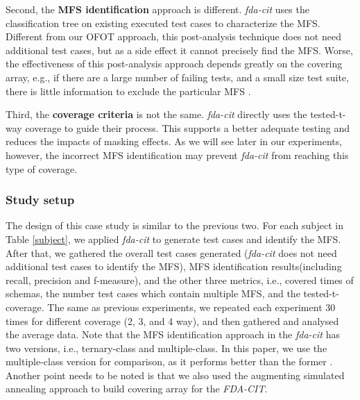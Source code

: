 \documentclass[10pt,journal,compsoc]{IEEEtran}
\begin{document}
Second, the \textbf{MFS identification} approach is different. \emph{fda-cit} uses the classification tree on existing executed test cases to characterize the MFS. Different from our OFOT approach, this post-analysis technique does not need additional test cases, but as a side effect it cannot precisely find the MFS. Worse, the effectiveness of this post-analysis approach depends greatly on the covering array, e.g., if there are a large number of failing tests, and a small size test suite, there is little information to exclude the particular MFS \cite{zhang2011characterizing}.

Third, the \textbf{coverage criteria} is not the same. \emph{fda-cit} directly uses the tested-t-way coverage to guide their process. This supports a better adequate testing and reduces the impacts of masking effects. As we will see later in our experiments, however, the incorrect MFS identification may prevent \emph{fda-cit} from reaching this type of coverage.


\subsubsection{Study setup}
The design of this case study is similar to the previous two. For each subject in Table \ref{subject}, we applied \emph{fda-cit} to generate test cases and identify the MFS. After that, we gathered the overall test cases generated (\emph{fda-cit} does not need additional test cases to identify the MFS), MFS identification results(including recall, precision and f-measure), and the other three metrics, i.e., covered times of schemas, the number test cases which contain multiple MFS, and the tested-t-coverage. The same as previous experiments, we repeated each experiment 30 times for different coverage (2, 3, and 4 way), and then gathered and analysed the average data.  Note that the MFS identification approach in the \emph{fda-cit} has two versions, i.e., ternary-class and multiple-class. In this paper, we use the multiple-class version for comparison, as it performs better than the former \cite{yilmaz2013reducing}. Another point needs to be noted is that we also used the augmenting simulated annealing approach \cite{cohen2003augmenting,cohen2008constructing2} to build covering array for the \emph{FDA-CIT}.

\end{document}
